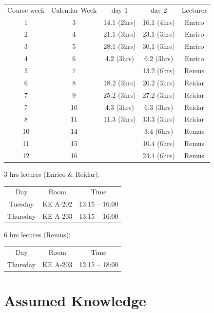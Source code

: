 \documentclass[letterpaper,12pt,oneside]{article}
\begin{document}
\begin{center}
\begin{tabular}{ c c c c c }

Course week & Calendar Week & day 1 & day 2 & Lecturer \\
1 &  3 & 14.1 (2hrs) & 16.1 (4hrs) & Enrico \\
2 &  4 & 21.1 (3hrs) & 23.1 (3hrs) & Enrico \\
3 &  5 & 28.1 (3hrs) & 30.1 (3hrs) & Enrico \\
4 &  6 &  4.2 (3hrs) &  6.2 (3hrs) & Enrico \\

5 &  7 & & 13.2 (6hrs) & Remus \\

6 &  8 & 18.2 (3hrs) & 20.2 (3hrs) & Reidar \\
7 &  9 & 25.2 (3hrs) & 27.2 (3hrs) & Reidar \\
7 &  10 &  4.3 (3hrs) & 6.3 (3hrs) & Reidar \\
8 &  11 & 11.3 (3hrs) & 13.3 (3hrs) & Reidar  \\

10 &  14 & &  3.4 (6hrs) & Remus \\
11 &  15 & & 10.4 (6hrs) & Remus \\
12 &  16 & & 24.4 (6hrs) & Remus 

\end{tabular}
\end{center}


3 hrs lecures (Enrico \& Reidar):  

\begin{center}
\begin{tabular}{ c c c  }
Day &  Room &  Time \\
Tuesday & KE A-202 & 13:15 – 16:00 \\
Thursday & KE A-203 & 13:15 – 16:00

\end{tabular}
\end{center}

6 hrs lecures (Remus): 

\begin{center}
\begin{tabular}{ c c c }
Day &  Room &  Time \\
Thursday & KE A-203 & 12:15 – 18:00

\end{tabular}
\end{center}


\section*{Assumed Knowledge}
 
\end{document}
